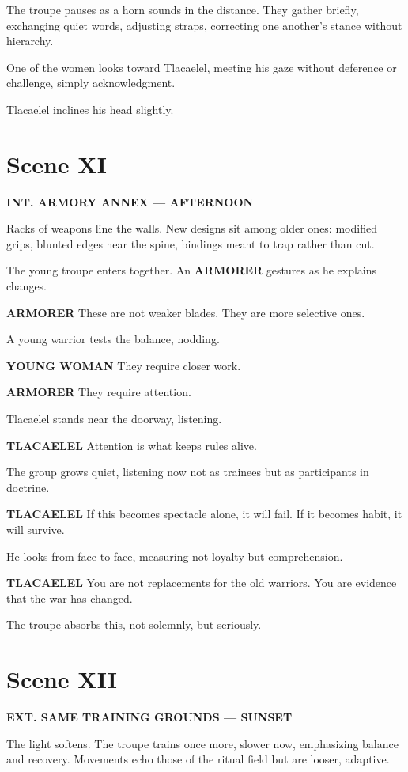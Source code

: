 \documentclass[12pt]{article}
\begin{document}
The troupe pauses as a horn sounds in the distance. They gather briefly, exchanging quiet words, adjusting straps, correcting one another’s stance without hierarchy.

One of the women looks toward Tlacaelel, meeting his gaze without deference or challenge, simply acknowledgment.

Tlacaelel inclines his head slightly.

\section*{Scene XI}

\textbf{INT. ARMORY ANNEX --- AFTERNOON}

Racks of weapons line the walls. New designs sit among older ones: modified grips, blunted edges near the spine, bindings meant to trap rather than cut.

The young troupe enters together. An \textbf{ARMORER} gestures as he explains changes.

\textbf{ARMORER}  
These are not weaker blades.  
They are more selective ones.

A young warrior tests the balance, nodding.

\textbf{YOUNG WOMAN}  
They require closer work.

\textbf{ARMORER}  
They require attention.

Tlacaelel stands near the doorway, listening.

\textbf{TLACAELEL}  
Attention is what keeps rules alive.

The group grows quiet, listening now not as trainees but as participants in doctrine.

\textbf{TLACAELEL}  
If this becomes spectacle alone, it will fail.  
If it becomes habit, it will survive.

He looks from face to face, measuring not loyalty but comprehension.

\textbf{TLACAELEL}  
You are not replacements for the old warriors.  
You are evidence that the war has changed.

The troupe absorbs this, not solemnly, but seriously.

\section*{Scene XII}

\textbf{EXT. SAME TRAINING GROUNDS --- SUNSET}

The light softens. The troupe trains once more, slower now, emphasizing balance and recovery. Movements echo those of the ritual field but are looser, adaptive.
\end{document}
